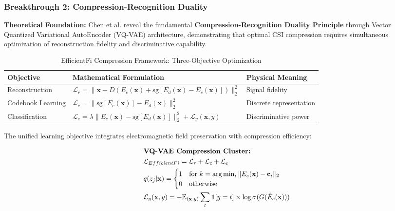 \documentclass[journal]{IEEEtran}
\begin{document}
\subsubsection{Breakthrough 2: Compression-Recognition Duality}

\textbf{Theoretical Foundation:} Chen et al. \cite{chen2024efficientfi} reveal the fundamental \textbf{Compression-Recognition Duality Principle} through Vector Quantized Variational AutoEncoder (VQ-VAE) architecture, demonstrating that optimal CSI compression requires simultaneous optimization of reconstruction fidelity and discriminative capability.

\begin{table}[h]
\centering
\caption{EfficientFi Compression Framework: Three-Objective Optimization}
\label{tab:efficientfi_framework}
\begin{tabular}{|p{1.3cm}|p{3.8cm}|p{1.4cm}|}
\hline
\textbf{Objective} & \textbf{Mathematical Formulation} & \textbf{Physical Meaning} \\
\hline
Reconstruction & $\mathcal{L}_r = \|\mathbf{x} - D(E_c(\mathbf{x}) + \text{sg}[E_d(\mathbf{x}) - E_c(\mathbf{x})])\|_2^2$ & Signal fidelity \\
Codebook Learning & $\mathcal{L}_c = \|\text{sg}[E_c(\mathbf{x})] - E_d(\mathbf{x})\|_2^2$ & Discrete representation \\
Classification & $\mathcal{L}_e = \lambda\|E_c(\mathbf{x}) - \text{sg}[E_d(\mathbf{x})]\|_2^2 + \mathcal{L}_y(\mathbf{x}, y)$ & Discriminative power \\
\hline
\end{tabular}
\end{table}

The unified learning objective integrates electromagnetic field preservation with compression efficiency:

\begin{align}
&\hspace{2em} \text{\textbf{VQ-VAE Compression Cluster:}} \quad &  \nonumber \\
&\hspace{2em} \mathcal{L}_{EfficientFi} = \mathcal{L}_r + \mathcal{L}_c + \mathcal{L}_e \label{eq:efficientfi_unified_v4} \\
&\hspace{2em} q(z_j|\mathbf{x}) = \begin{cases}
1 & \text{for } k = \arg\min_i \|E_c(\mathbf{x}) - \mathbf{c}_i\|_2 \\
0 & \text{otherwise}
\end{cases} \label{eq:quantization_v4} \\
&\hspace{2em} \mathcal{L}_y(\mathbf{x}, y) = -\mathbb{E}_{(\mathbf{x},y)} \sum_t \mathbf{1}[y = t] \times \log \sigma(G(\hat{E}_c(\mathbf{x}))) \label{eq:crossentropy_v4}
\end{align}
\end{document}
